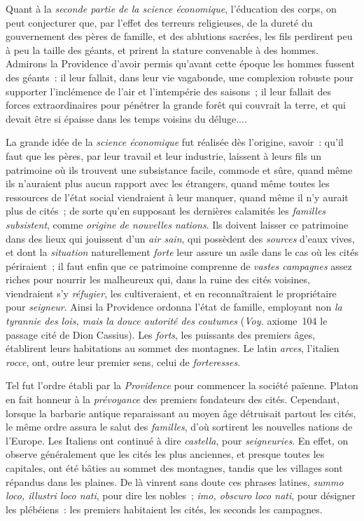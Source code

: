 \documentclass[french,twoside]{book} %
\begin{document}
Quant à la {\itshape seconde partie de la science économique}, l’éducation des corps, on peut conjecturer que, par l’effet des terreurs religieuses, de la dureté du gouvernement des pères de famille, et des ablutions sacrées, les fils perdirent peu à peu la taille  des géants, et prirent la stature convenable à des hommes. Admirons la Providence d’avoir permis qu’avant cette époque les hommes fussent des géants : il leur fallait, dans leur vie vagabonde, une complexion robuste pour supporter l’inclémence de l’air et l’intempérie des saisons ; il leur fallait des forces extraordinaires pour pénétrer la grande forêt qui couvrait la terre, et qui devait être si épaisse dans les temps voisins du déluge....\par
La grande idée de la {\itshape science économique} fut réalisée dès l’origine, savoir : qu’il faut que les pères, par leur travail et leur industrie, laissent à leurs fils un patrimoine où ils trouvent une subsistance facile, commode et sûre, quand même ils n’auraient plus aucun rapport avec les étrangers, quand même toutes les ressources de l’état social viendraient à leur manquer, quand même il n’y aurait plus de cités ; de sorte qu’en supposant les dernières calamités les {\itshape familles subsistent}, comme {\itshape origine de nouvelles nations}. Ils doivent laisser ce patrimoine dans des lieux qui jouissent d’un {\itshape air sain}, qui possèdent des {\itshape sources} d’eaux vives, et dont la {\itshape situation} naturellement {\itshape forte} leur assure un asile dans le cas où les cités périraient ; il faut enfin que ce patrimoine comprenne de {\itshape vastes campagnes} assez riches pour nourrir les malheureux qui, dans la ruine des cités voisines, viendraient s’y {\itshape réfugier}, les cultiveraient, et en reconnaîtraient le propriétaire pour {\itshape seigneur}. Ainsi la Providence ordonna l’état de famille, employant non {\itshape la tyrannie des lois, mais la}  {\itshape douce autorité des coutumes} ({\itshape Voy.} axiome 104 le passage cité de Dion Cassius). Les {\itshape forts}, les puissants des premiers âges, établirent leurs habitations au sommet des montagnes. Le latin {\itshape arces}, l’italien {\itshape rocce}, ont, outre leur premier sens, celui de {\itshape forteresses}.\par
Tel fut l’ordre établi par la {\itshape Providence} pour commencer la société païenne. Platon en fait honneur à la {\itshape prévoyance} des premiers fondateurs des cités. Cependant, lorsque la barbarie antique reparaissant au moyen âge détruisait partout les cités, le même ordre assura le salut des {\itshape familles}, d’où sortirent les nouvelles nations de l’Europe. Les Italiens ont continué à dire {\itshape castella}, pour {\itshape seigneuries}. En effet, on observe généralement que les cités les plus anciennes, et presque toutes les capitales, ont été bâties au sommet des montagnes, tandis que les villages sont répandus dans les plaines. De là vinrent sans doute ces phrases latines, {\itshape summo loco, illustri loco nati}, pour dire les nobles ; {\itshape imo, obscuro loco nati}, pour désigner les plébéiens : les premiers habitaient les cités, les seconds les campagnes.\par
\end{document}
